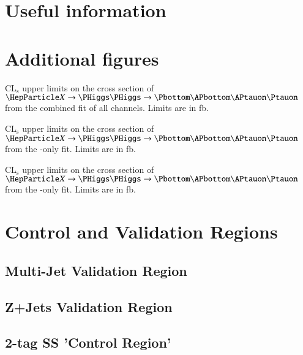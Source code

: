 \chapter{Useful information}
\label{sec:app}


\chapter{Additional figures}
\label{sec:app_additional_figures}

\begin{table}[htbp]
  \centering

  
  \caption{$\text{CL}_\text{s}$ upper limits on the cross section of
    $\PX \ra \PHiggs \PHiggs \ra \bbtautau$ from the combined fit of
    all channels. Limits are in fb.}
  \label{tab:comb_limits_resonant}
\end{table}


\begin{table}[htbp]
  \centering

  
  \caption{$\text{CL}_\text{s}$ upper limits on the cross section of
    $\PX \ra \PHiggs \PHiggs \ra \bbtautau$ from the \hadhad-only
    fit. Limits are in fb.}
  \label{tab:hadhad_limits_resonant}
\end{table}


\begin{table}[htbp]
  \centering

  
  \caption{$\text{CL}_\text{s}$ upper limits on the cross section of
    $\PX \ra \PHiggs \PHiggs \ra \bbtautau$ from the \lephad-only
    fit. Limits are in fb.}
  \label{tab:lephad_limits_resonant}
\end{table}


\chapter{Control and Validation Regions}


\section{Multi-Jet Validation Region}

\section{Z+Jets Validation Region}

\section{2-tag SS 'Control Region'}

